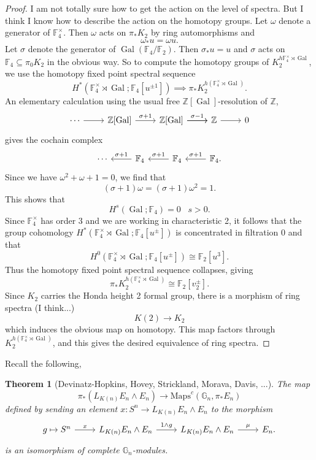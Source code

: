 \documentclass[12pt]{amsart}
\newcommand{\Maps}{\mathrm{Maps}}
\newcommand{\Z}{\mathbb{Z}}
\newcommand{\F}{\mathbb{F}}
\newcommand{\G}{\mathbb{G}}
\DeclareMathOperator{\Gal}{Gal}
\newtheorem{thm}{Theorem}
\theoremstyle{definition}
\numberwithin{equation}{section}
\numberwithin{figure}{section}
\begin{document}
\begin{proof}
	I am not totally sure how to get the action on the level of spectra. But I think I know how to describe the action on the homotopy groups. Let $\omega$ denote a generator of $\F_4^\times$. Then $\omega$ acts on $\pi_*K_2$ by ring automorphisms and 
	\[
	\omega_*u  = \omega u. 
	\]
	Let $\sigma$ denote the generator of $\Gal(\F_4/\F_2)$. Then $\sigma_*u=u$ and $\sigma$ acts on $\F_4\subseteq \pi_0K_2$ in the obvious way. So to compute the homotopy groups of $K_2^{h\F_4^\times \rtimes \Gal}$, we use the homotopy fixed point spectral sequence
	\[
	H^*(\F_4^\times\rtimes \Gal; \F_4[u^{\pm 1}])\implies \pi_*K_2^{h(\F_4^\times\rtimes \Gal)}.
	\]
	An elementary calculation using the usual free $\Z[\Gal]$-resolution of $\Z$,
	\[
	\begin{tikzcd}
		\cdots \arrow[r] & \Z[\Gal]\arrow[r, "\sigma+1"] & \Z[\Gal]\arrow[r,"\sigma-1"]\arrow[r] & \Z\arrow[r] & 0
	\end{tikzcd}
	\]
	gives the cochain complex
	\[
	\begin{tikzcd}
		\cdots & \F_4 \arrow[l, swap, "\sigma+1"]& \F_4 \arrow[l,swap, "\sigma+1"]  & \F_4 \arrow[l, swap,"\sigma+1"].
	\end{tikzcd}
	\]
	Since we have $\omega^2+\omega+1=0$, we find that 
	\[
	(\sigma+1)\omega = (\sigma+1)\omega^2 = 1.
	\]
	This shows that 
	\[
	H^s(\Gal;\F_4)= 0 \hspace{10pt} s>0.
	\]
	Since $\F_4^\times$ has order 3 and we are working in characteristic 2, it follows that the group cohomology $H^*(\F_4^\times \rtimes \Gal;\F_4[u^{\pm}])$ is concentrated in filtration 0 and that 
	\[
	H^0(\F_4^\times \rtimes \Gal;\F_4[u^{\pm}])\cong \F_2[u^{3}].
	\]
	Thus the homotopy fixed point spectral sequence collapses, giving 
	\[
	\pi_*K_2^{h(\F_4^\times \rtimes \Gal)}\cong \F_2[v_2^{\pm}].
	\]
	Since $K_2$ carries the Honda height 2 formal group, there is a morphism of ring spectra (I think...)
	\[
	K(2)\to K_2
	\]
	which induces the obvious map on homotopy. This map factors through $K_2^{h(\F_4^\times \rtimes \Gal)}$, and this gives the desired equivalence of ring spectra.
\end{proof}

Recall the following, 

\begin{thm}[Devinatz-Hopkins, Hovey, Strickland, Morava, Davis, ...]
	The map 
	\[
	\pi_*(L_{K(n)}E_n\wedge E_n)\to \Maps^c(\G_n, \pi_*E_n)
	\]
	defined by sending an element $x: S^n\to L_{K(n)}E_n\wedge E_n$ to the morphism 
	\[
	\begin{tikzcd}
		g\mapsto S^n\arrow[r,"x"] & L_{K(n)}E_n\wedge E_n\arrow[r, "1\wedge g"] & L_{K(n)}E_n\wedge E_n\arrow[r, "\mu"] & E_n. 
	\end{tikzcd}
	\]
	is an isomorphism of complete $\G_n$-modules.
\end{thm}
\end{document}
